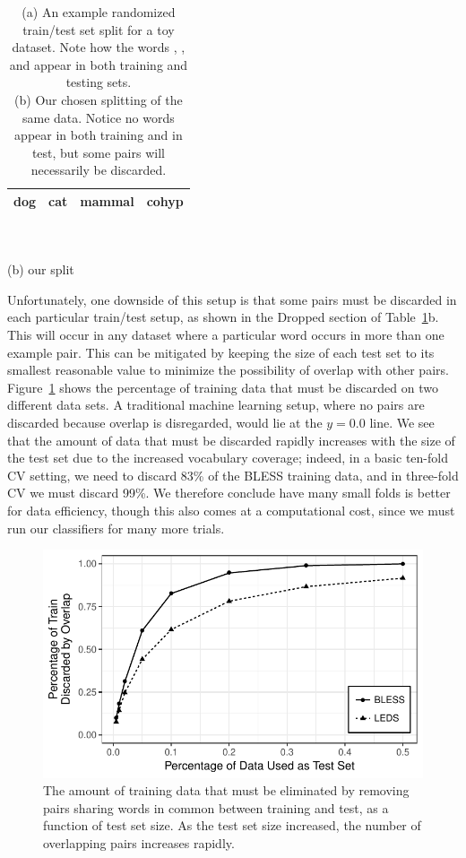 \begin{table}
\begin{minipage}[b]{6cm}
\begin{tabular}{|llll|}
    dog       &  cat      &  mammal        & cohyp       \\
    \hline
  \end{tabular}\\~\\{\small (b) our split}
  \end{minipage}
  \caption{(a) An example randomized train/test set split for a toy dataset.
  Note how the words , , and  appear in both
  training and testing sets.\\(b) Our chosen splitting of the same data. Notice
  no words appear in both training and in test, but some pairs will necessarily
  be discarded.}
\label{tab:splits}
\end{table}

Unfortunately, one downside of this setup is that some pairs must be discarded
in each particular train/test setup, as shown in the Dropped section of
Table~\ref{tab:splits}b. This will occur in any dataset where a particular word
occurs in more than one example pair.  This can be mitigated by keeping the
size of each test set to its smallest reasonable value to minimize the
possibility of overlap with other pairs. Figure~\ref{fig:dataloss} shows the
percentage of training data that must be discarded on two different data sets.
A traditional machine learning setup, where no pairs are discarded because
overlap is disregarded, would lie at the $y = 0.0$ line. We see that the
amount of data that must be discarded rapidly increases with the size of
the test set due to the increased vocabulary coverage; indeed, in a basic
ten-fold CV setting, we need to discard 83\% of the BLESS training data, and
in three-fold CV we must discard 99\%. We therefore conclude have many small
folds is better for data efficiency, though this also comes at a computational
cost, since we must run our classifiers for many more trials.

\begin{figure}
  \centering
  \includegraphics{plots/foldloss}
  \caption{The amount of training data that must be eliminated by removing pairs
    sharing words in common between training and test, as a function of test
    set size. As the test set size increased, the number of overlapping pairs
    increases rapidly.}
  \label{fig:dataloss}
\end{figure}

